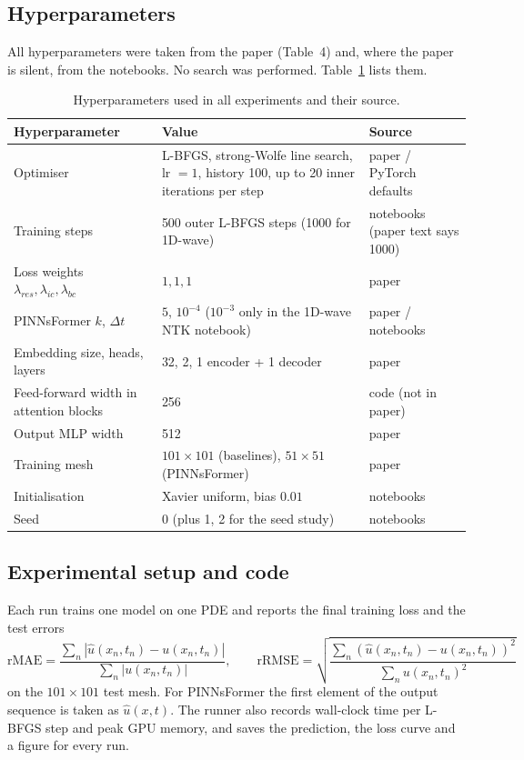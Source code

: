 \documentclass[10pt]{article} %
\begin{document}
\subsection{Hyperparameters}
All hyperparameters were taken from the paper (Table~4) and, where the paper is silent, from the notebooks. No search was performed. Table~\ref{tab:hparams} lists them.
\begin{table}[ht]
\caption{Hyperparameters used in all experiments and their source.}
\label{tab:hparams}
\begin{center}
\small
\begin{tabular}{l p{5.4cm} p{3.4cm}}
\toprule
Hyperparameter & Value & Source \\
\midrule
Optimiser & L-BFGS, strong-Wolfe line search, lr $=1$, history 100, up to 20 inner iterations per step & paper / PyTorch defaults \\
Training steps & 500 outer L-BFGS steps (1000 for 1D-wave) & notebooks (paper text says 1000) \\
Loss weights $\lambda_{res},\lambda_{ic},\lambda_{bc}$ & $1,1,1$ & paper \\
PINNsFormer $k$, $\Delta t$ & $5$, $10^{-4}$ ($10^{-3}$ only in the 1D-wave NTK notebook) & paper / notebooks \\
Embedding size, heads, layers & 32, 2, 1 encoder + 1 decoder & paper \\
Feed-forward width in attention blocks & 256 & code (not in paper) \\
Output MLP width & 512 & paper \\
Training mesh & $101\times101$ (baselines), $51\times51$ (PINNsFormer) & paper \\
Initialisation & Xavier uniform, bias $0.01$ & notebooks \\
Seed & 0 (plus 1, 2 for the seed study) & notebooks \\
\bottomrule
\end{tabular}
\end{center}
\end{table}

\subsection{Experimental setup and code}
Each run trains one model on one PDE and reports the final training loss and the test errors
\[
\text{rMAE}=\frac{\sum_n|\hat u(x_n,t_n)-u(x_n,t_n)|}{\sum_n|u(x_n,t_n)|},\qquad
\text{rRMSE}=\sqrt{\frac{\sum_n(\hat u(x_n,t_n)-u(x_n,t_n))^2}{\sum_n u(x_n,t_n)^2}}
\]
on the $101\times101$ test mesh. For PINNsFormer the first element of the output sequence is taken as $\hat u(x,t)$. The runner also records wall-clock time per L-BFGS step and peak GPU memory, and saves the prediction, the loss curve and a figure for every run.
\end{document}

